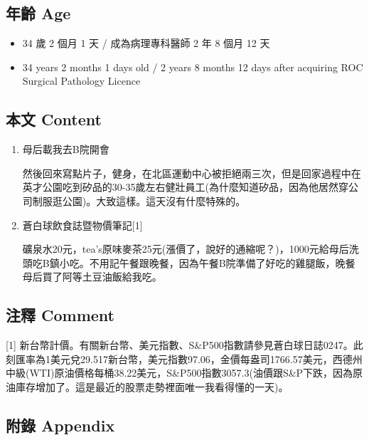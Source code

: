 \documentclass[a5paper, 11pt
]{book}
\providecommand{\tightlist}{%
  \setlength{\itemsep}{0pt}\setlength{\parskip}{0pt}}
\begin{document}
\hypertarget{ux5e74ux9f61-age-23}{%
\subsection{年齡 Age}\label{ux5e74ux9f61-age-23}}

\begin{itemize}
\tightlist
\item
  34 歲 2 個月 1 天 / 成為病理專科醫師 2 年 8 個月 12 天
\item
  34 years 2 months 1 days old / 2 years 8 months 12 days after
  acquiring ROC Surgical Pathology Licence
\end{itemize}

\hypertarget{ux672cux6587-content-23}{%
\subsection{本文 Content}\label{ux672cux6587-content-23}}

\begin{enumerate}
\def\labelenumi{\arabic{enumi}.}
\item
  母后載我去B院開會

  然後回來寫點片子，健身，在北區運動中心被拒絕兩三次，但是回家過程中在英才公園吃到矽品的30-35歲左右健壯員工(為什麼知道矽品，因為他居然穿公司制服逛公園)。大致這樣。這天沒有什麼特殊的。
\item
  蒼白球飲食誌暨物價筆記{[}1{]}

  礦泉水20元，tea's原味麥茶25元(漲價了，說好的通縮呢？)，1000元給母后洗頭吃B鎮小吃。不用記午餐跟晚餐，因為午餐B院準備了好吃的雞腿飯，晚餐母后買了阿等土豆油飯給我吃。
\end{enumerate}

\hypertarget{ux6ce8ux91cb-comment-23}{%
\subsection{注釋 Comment}\label{ux6ce8ux91cb-comment-23}}

{[}1{]}
新台幣計價。有關新台幣、美元指數、S\&P500指數請參見蒼白球日誌0247。此刻匯率為1美元兌29.517新台幣，美元指數97.06，金價每盎司1766.57美元，西德州中級(WTI)原油價格每桶38.22美元，S\&P500指數3057.3(油價跟S\&P下跌，因為原油庫存增加了。這是最近的股票走勢裡面唯一我看得懂的一天)。

\hypertarget{ux9644ux9304-appendix-23}{%
\subsection{附錄 Appendix}\label{ux9644ux9304-appendix-23}}
\end{document}
